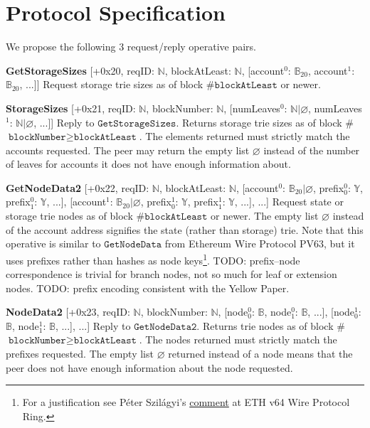 \documentclass{amsart}
\begin{document}
\section{Protocol Specification}

We propose the following 3 request/reply operative pairs.

\textbf{GetStorageSizes} [+0x20, reqID: $\mathbb{N}$, blockAtLeast: $\mathbb{N}$,
[account$^0$: $\mathbb{B}_{20}$, account$^1$: $\mathbb{B}_{20}$, ...]]
Request storage trie sizes as of block \#$\texttt{blockAtLeast}$ or newer.

\textbf{StorageSizes} [+0x21, reqID: $\mathbb{N}$, blockNumber: $\mathbb{N}$,
[numLeaves$^0$: $\mathbb{N} | \varnothing$, numLeaves$^1$: $\mathbb{N} | \varnothing$, ...]]
Reply to $\texttt{GetStorageSizes}$.
Returns storage trie sizes as of block \#$\texttt{blockNumber} \geq \texttt{blockAtLeast}$.
The elements returned must strictly match the accounts requested.
The peer may return the empty list $\varnothing$ instead of the number of leaves for accounts it does not have enough information about.

\textbf{GetNodeData2} [+0x22, reqID: $\mathbb{N}$, blockAtLeast: $\mathbb{N}$,
[account$^0$: $\mathbb{B}_{20} | \varnothing$, prefix$^0_0$: $\mathbb{Y}$, prefix$^0_1$: $\mathbb{Y}$, ...],
[account$^1$: $\mathbb{B}_{20} | \varnothing$, prefix$^1_0$: $\mathbb{Y}$, prefix$^1_1$: $\mathbb{Y}$, ...],
...]
Request state or storage trie nodes as of block \#$\texttt{blockAtLeast}$ or newer.
The empty list $\varnothing$ instead of the account address signifies the state (rather than storage) trie.
Note that this operative is similar to $\texttt{GetNodeData}$ from Ethereum Wire Protocol PV63,
but it uses prefixes rather than hashes as node keys\footnote{For
a justification see Péter Szilágyi's
\href{https://ethereum-magicians.org/t/forming-a-ring-eth-v64-wire-protocol-ring/2857/10}{comment}
at ETH v64 Wire Protocol Ring.}.
TODO: prefix--node correspondence is trivial for branch nodes, not so much for leaf or extension nodes.
TODO: prefix encoding consistent with the Yellow Paper.

\textbf{NodeData2} [+0x23, reqID: $\mathbb{N}$,  blockNumber: $\mathbb{N}$,
[node$^0_0$: $\mathbb{B}$, node$^0_1$: $\mathbb{B}$, ...],
[node$^1_0$: $\mathbb{B}$, node$^1_1$: $\mathbb{B}$, ...],
...]
Reply to $\texttt{GetNodeData2}$.
Returns trie nodes as of block \#$\texttt{blockNumber} \geq \texttt{blockAtLeast}$.
The nodes returned must strictly match the prefixes requested.
The empty list $\varnothing$ returned instead of a node means that the peer does not have enough information about the node requested.
\end{document}
